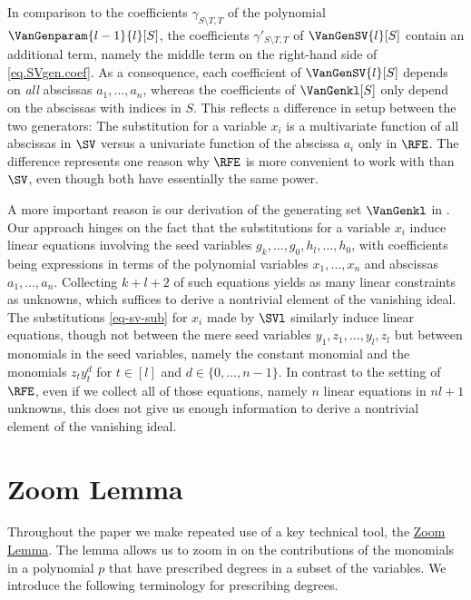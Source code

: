In comparison to the coefficients $\gamma_{S \setminus T, T}$ of the polynomial $\VanGenparam{l-1}{l}[S]$, the coefficients $\gamma'_{S \setminus T, T}$ of $\VanGenSV{l}[S]$ contain an additional term, namely the middle term on the right-hand side of \eqref{eq.SVgen.coef}. As a consequence, each coefficient of $\VanGenSV{l}[S]$ depends on \emph{all} abscissas $a_1,\dots,a_n$, whereas the coefficients of $\VanGenkl[S]$ only depend on the abscissas with indices in $S$. This reflects a difference in setup between the two generators: The substitution for a variable $x_i$ is a multivariate function of all abscissas in $\SV$ versus a univariate function of the abscissa $a_i$ only in $\RFE$. The difference represents one reason why $\RFE$ is more convenient to work with than $\SV$, even though both have essentially the same power.

A more important reason is our derivation of the generating set $\VanGenkl$ in . Our approach hinges on the fact that the substitutions for a variable $x_i$ induce linear equations involving the seed variables $g_{k},\dots,g_{0},h_{l},\dots,h_{0}$, with coefficients being expressions in terms of the polynomial variables $x_1,\dots,x_n$ and abscissas $a_1,\dots,a_n$. Collecting $k+l+2$ of such equations yields as many linear constraints as unknowns, which suffices to derive a nontrivial element of the vanishing ideal. The substitutions \eqref{eq-sv-sub} for $x_i$ made by $\SVl$ similarly induce linear equations, though not between the mere seed variables $y_1, z_1, \dots, y_l, z_l$ but between monomials in the seed variables, namely the constant monomial and the monomials $z_t y_t^d$ for $t\in [l]$ and $d\in \{0,\dots,n-1\}$. In contrast to the setting of $\RFE$, even if we collect all of those equations, namely $n$ linear equations in $nl+1$ unknowns, this does not give us enough information to derive a nontrivial element of the vanishing ideal.

\section{Zoom Lemma}
\label{s.zoom}

Throughout the paper we make repeated use of a key technical tool,
the \hyperref[lem.multi-zsub-deriv]{Zoom Lemma}.
The lemma allows us to zoom in on the contributions of the monomials in a
polynomial $p$ that have prescribed degrees in a subset of the variables.
We introduce the following terminology for prescribing degrees.

